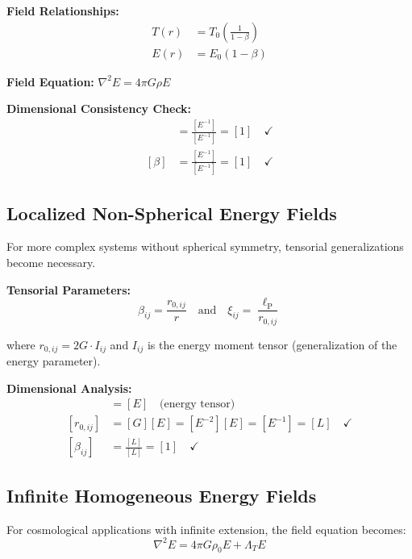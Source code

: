 \documentclass[12pt,a4paper]{report}
\newcommand{\lP}{\ell_{\text{P}}}         %
\newcommand{\Lambdat}{\Lambda_T}          %
\begin{document}
	\textbf{Field Relationships:}
	\begin{align}
		T(r) &= T_0\left(\frac{1}{1 - \beta}\right) \\
		E(r) &= E_0(1 - \beta)
	\end{align}
	
	\textbf{Field Equation:} $\nabla^2 E = 4\pi G \rho E$
	
	\textbf{Dimensional Consistency Check:}
	\begin{align}
		[\xi] &= \frac{[E^{-1}]}{[E^{-1}]} = [1] \quad \checkmark \\
		[\beta] &= \frac{[E^{-1}]}{[E^{-1}]} = [1] \quad \checkmark
	\end{align}
	
	\subsection{Localized Non-Spherical Energy Fields}\label{subsec:localized_non_spherical}
	
	For more complex systems without spherical symmetry, tensorial generalizations become necessary.
	
	\textbf{Tensorial Parameters:}
	\begin{equation}
		\beta_{ij} = \frac{r_{0,ij}}{r} \quad \text{and} \quad 	\xi_{ij} = \frac{\lP}{r_{0,ij}}
		\label{eq:tensorial_parameters}
	\end{equation}
	
	where $r_{0,ij} = 2G \cdot I_{ij}$ and $I_{ij}$ is the energy moment tensor (generalization of the energy parameter).
	
	\textbf{Dimensional Analysis:}
	\begin{align}
		[I_{ij}] &= [E] \quad \text{(energy tensor)} \\
		[r_{0,ij}] &= [G][E] = [E^{-2}][E] = [E^{-1}] = [L] \quad \checkmark \\
		[\beta_{ij}] &= \frac{[L]}{[L]} = [1] \quad \checkmark
	\end{align}
	
	\subsection{Infinite Homogeneous Energy Fields}\label{subsec:infinite_homogeneous}
	
	For cosmological applications with infinite extension, the field equation becomes:
	\begin{equation}
		\nabla^2 E = 4\pi G \rho_0 E + \Lambdat E
		\label{eq:field_equation_cosmological}
	\end{equation}
	
\end{document}
